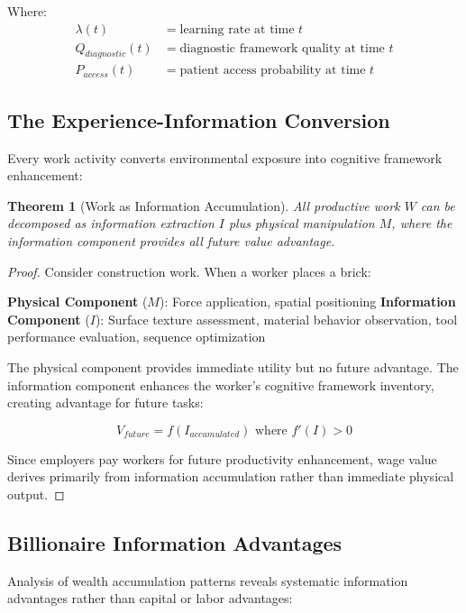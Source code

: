 \documentclass[12pt,a4paper]{article}
\newtheorem{theorem}{Theorem}
\begin{document}
Where:
\begin{align}
\lambda(t) &= \text{learning rate at time } t \\
Q_{diagnostic}(t) &= \text{diagnostic framework quality at time } t \\
P_{access}(t) &= \text{patient access probability at time } t
\end{align}

\subsection{The Experience-Information Conversion}

Every work activity converts environmental exposure into cognitive framework enhancement:

\begin{theorem}[Work as Information Accumulation]
All productive work $W$ can be decomposed as information extraction $I$ plus physical manipulation $M$, where the information component provides all future value advantage.
\end{theorem}

\begin{proof}
Consider construction work. When a worker places a brick:

\textbf{Physical Component} ($M$): Force application, spatial positioning
\textbf{Information Component} ($I$): Surface texture assessment, material behavior observation, tool performance evaluation, sequence optimization

The physical component provides immediate utility but no future advantage. The information component enhances the worker's cognitive framework inventory, creating advantage for future tasks:

$$V_{future} = f(I_{accumulated}) \text{ where } f'(I) > 0$$

Since employers pay workers for future productivity enhancement, wage value derives primarily from information accumulation rather than immediate physical output.
\end{proof}

\subsection{Billionaire Information Advantages}

Analysis of wealth accumulation patterns reveals systematic information advantages rather than capital or labor advantages:
\end{document}
